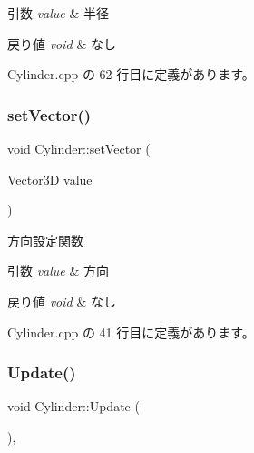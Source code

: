 \begin{DoxyParams}{引数}
{\em value} & 半径 \\
\hline
\end{DoxyParams}

\begin{DoxyRetVals}{戻り値}
{\em void} & なし \\
\hline
\end{DoxyRetVals}


 Cylinder.\+cpp の 62 行目に定義があります。

\mbox{\label{class_cylinder_aaf5a9d7cf018efb1e200a1e4ccb41a20}} 
\subsubsection{\texorpdfstring{set\+Vector()}{setVector()}}
{\footnotesize\ttfamily void Cylinder\+::set\+Vector (\begin{DoxyParamCaption}\item[{\mbox{\hyperlink{class_vector3_d}{Vector3D}}}]{value }\end{DoxyParamCaption})}



方向設定関数 


\begin{DoxyParams}{引数}
{\em value} & 方向 \\
\hline
\end{DoxyParams}

\begin{DoxyRetVals}{戻り値}
{\em void} & なし \\
\hline
\end{DoxyRetVals}


 Cylinder.\+cpp の 41 行目に定義があります。

\mbox{\label{class_cylinder_a7b835c069d873b53d57fd01b9f44bacd}} 
\subsubsection{\texorpdfstring{Update()}{Update()}}
{\footnotesize\ttfamily void Cylinder\+::\+Update (\begin{DoxyParamCaption}{ }\end{DoxyParamCaption})\hspace{0.3cm}{\ttfamily [override]}, {\ttfamily [virtual]}}



